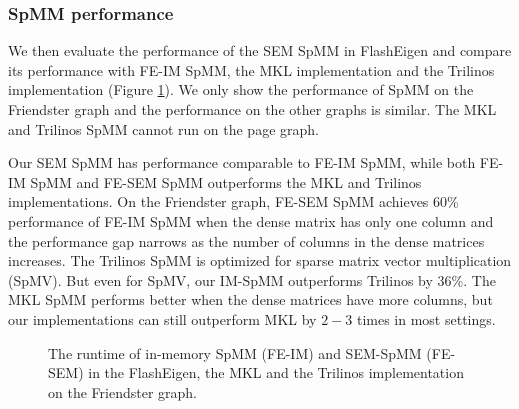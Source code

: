 \subsubsection{SpMM performance}

We then evaluate the performance of the SEM SpMM in FlashEigen and compare its
performance with FE-IM SpMM, the MKL implementation and the Trilinos
implementation (Figure \ref{perf:spmm}). We only show the performance of
SpMM on the Friendster graph and the performance on the other graphs is
similar. The MKL and Trilinos SpMM cannot run on the page graph.

Our SEM SpMM has performance comparable to FE-IM SpMM, while both FE-IM SpMM
and FE-SEM SpMM outperforms the MKL and Trilinos implementations.
On the Friendster graph, FE-SEM SpMM achieves 60\% performance of FE-IM SpMM
when the dense matrix has only one column and the performance gap narrows
as the number of columns in the dense matrices increases.
The Trilinos SpMM is optimized for sparse matrix vector multiplication (SpMV).
But even for SpMV, our IM-SpMM outperforms Trilinos by 36\%. The MKL SpMM
performs better when the dense matrices have more columns, but our
implementations can still outperform MKL by $2-3$ times in most settings.

\begin{figure}
	\begin{center}
		\footnotesize
		\vspace{-15pt}
		
		\vspace{-15pt}
		\caption{The runtime of in-memory SpMM (FE-IM) and SEM-SpMM (FE-SEM)
			in the FlashEigen, the MKL and the Trilinos implementation on
		the Friendster graph.}
		\label{perf:spmm}
	\end{center}
\end{figure}

%		

%		
%		

